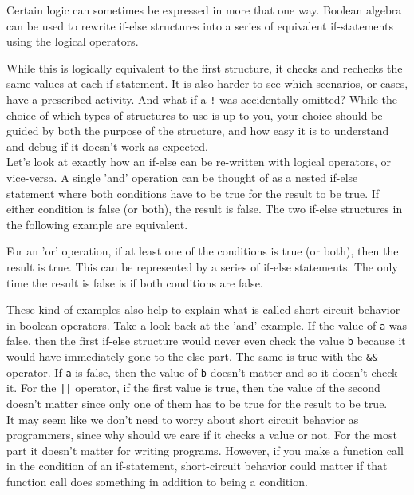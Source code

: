 Certain logic can sometimes be expressed in more that one way. Boolean algebra can be used to rewrite if-else structures into a series of equivalent  if-statements using the logical operators.


While this is logically equivalent to the first structure, it checks and rechecks the same values at each if-statement. It is also harder to see which scenarios, or cases, have a prescribed activity. And what if a \texttt{!} was accidentally omitted? While the choice of which types of structures to use is up to you, your choice should be guided by both the purpose of the structure, and how easy it is to understand and debug if it doesn't work as expected.\\

Let's look at exactly how an if-else can be re-written with logical operators, or vice-versa. A single 'and' operation can be thought of as a nested if-else statement where both conditions have to be true for the result to be true. If either condition is false (or both), the result is false. The two if-else structures in the following example are equivalent.


For an 'or' operation, if at least one of the conditions is true (or both), then the result is true. This can be represented by a series of if-else statements. The only time the result is false is if both conditions are false.


These kind of examples also help to explain what is called short-circuit behavior in boolean operators. Take a look back at the 'and' example. If the value of \texttt{a} was false, then the first if-else structure would never even check the value \texttt{b} because it would have immediately gone to the else part. The same is true with the \texttt{\&\&} operator. If \texttt{a} is false, then the value of \texttt{b} doesn't matter and so it doesn't check it. For the \texttt{||} operator, if the first value is true, then the value of the second doesn't matter since only one of them has to be true for the result to be true.\\

It may seem like we don't need to worry about short circuit behavior as programmers, since why should we care if it checks a value or not. For the most part it doesn't matter for writing programs. However, if you make a function call in the condition of an if-statement, short-circuit behavior could matter if that function call does something in addition to being a condition.

